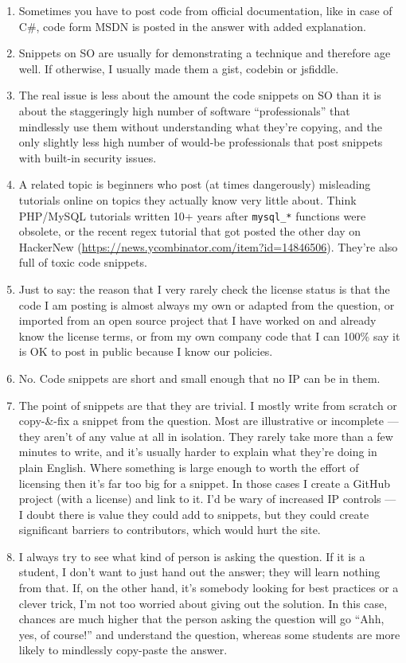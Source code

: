 \documentclass{svjour3}                     %
\begin{document}
\begin{enumerate}
	\itemsep1em
	\item Sometimes you have to post code from official documentation, like in case of C\#, code form MSDN is posted in the answer with added explanation.
	\item Snippets on SO are usually for demonstrating a technique and therefore age well. If otherwise, I usually made them a gist, codebin or jsfiddle.
	\item The real issue is less about the amount the code snippets on SO than it is about the staggeringly high number of software ``professionals'' that mindlessly use them without understanding what they're copying, and the only slightly less high number of would-be professionals that post snippets with built-in security issues.
	\item A related topic is beginners who post (at times dangerously) misleading tutorials online on topics they actually know very little about. Think PHP/MySQL tutorials written 10+ years after \texttt{mysql\_*} functions were obsolete, or the recent regex tutorial that got posted the other day on HackerNew (\url{https://news.ycombinator.com/item?id=14846506}). They're also full of toxic code snippets.
	\item Just to say: the reason that I very rarely check the license status is that the code I am posting is almost always my own or adapted from the question, or imported from an open source project that I have worked on and already know the license terms, or from my own company code that I can 100\% say it is OK to post in public because I know our policies.
	\item No. Code snippets are short and small enough that no IP can be in them.
	\item The point of snippets are that they are trivial. I mostly write from scratch or copy-\&-fix a snippet from the question. Most are illustrative or incomplete --- they aren't of any value at all in isolation. They rarely take more than a few minutes to write, and it's usually harder to explain what they're doing in plain English. Where something is large enough to worth the effort of licensing then it's far too big for a snippet. In those cases I create a GitHub project (with a license) and link to it. I'd be wary of increased IP controls --- I doubt there is value they could add to snippets, but they could create significant barriers to contributors, which would hurt the site.
	\item I always try to see what kind of person is asking the question. If it is a student, I don't want to just hand out the answer; they will learn nothing from that. If, on the other hand, it's somebody looking for best practices or a clever trick, I'm not too worried about giving out the solution. In this case, chances are much higher that the person asking the question will go ``Ahh, yes, of course!'' and understand the question, whereas some students are more likely to mindlessly copy-paste the answer.

\end{enumerate}
\end{document}
